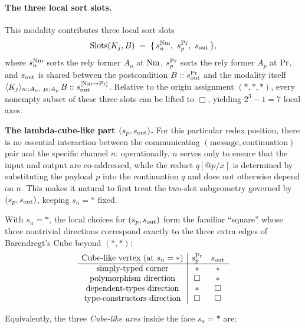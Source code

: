 \documentclass[11pt]{article}
\theoremstyle{definition}
\theoremstyle{plain}
\theoremstyle{remark}
\theoremstyle{plain}
\newcommand{\angles}[3]{\langle #1 \rangle_{#2}\,#3}
\newcommand{\Slots}{\mathrm{Slots}}
\newcommand{\Boxsort}{\Box}
\newcommand{\astsort}{\ast}
\renewcommand{\Pr}{{\rm Pr}}
\newcommand{\Nm}{{\rm Nm}}
\begin{document}
\paragraph{The three local sort slots.}
This modality contributes three local sort slots
\[
  \Slots(K_j,B) \;=\; \{\,s_n^{\Nm},\ s_p^{\Pr},\ s_{\rm out}\,\},
\]
where \(s_n^{\Nm}\) sorts the rely former \(A_n\) at \(\Nm\), \(s_p^{\Pr}\) sorts the rely former
\(A_p\) at \(\Pr\), and \(s_{\rm out}\) is shared between the postcondition \(B::s_{\rm out}^{\Pr}\) and the
modality itself \(\angles{K_j}{n::A_n,\ p::A_p}{B}::s_{\rm out}^{[\Nm\to\Pr]}\).
Relative to the origin assignment \((\astsort,\astsort,\astsort)\), every nonempty subset of these three
slots can be lifted to \(\Boxsort\), yielding \(2^3-1=7\) local axes.

\medskip

\noindent\textbf{The lambda-cube-like part \((s_p,s_{\rm out})\).}
For this particular redex position, there is no essential interaction between the
communicating \((\text{message},\text{continuation})\) pair and the specific channel \(n\): operationally,
\(n\) serves only to ensure that the input and output are co-addressed, while the reduct \(q[@p/x]\) is
determined by substituting the payload \(p\) into the continuation \(q\) and does not otherwise depend on
\(n\).  This makes it natural to first treat the two-slot subgeometry governed by \((s_p,s_{\rm out})\),
keeping \(s_n=\astsort\) fixed.

With \(s_n=\astsort\), the local choices for \((s_p,s_{\rm out})\) form the familiar ``square'' whose three
nontrivial directions correspond exactly to the three extra edges of Barendregt's Cube beyond
\((\astsort,\astsort)\):
\[
\begin{array}{c|cc}
\text{Cube-like vertex (at }s_n=\astsort\text{)} & s_p^{\Pr} & s_{\rm out} \\
\hline
\text{simply-typed corner} & \astsort & \astsort \\
\text{polymorphism direction} & \Boxsort & \astsort \\
\text{dependent-types direction} & \astsort & \Boxsort \\
\text{type-constructors direction} & \Boxsort & \Boxsort
\end{array}
\]

Equivalently, the three \emph{Cube-like axes} inside the face \(s_n=\astsort\) are:
\end{document}
